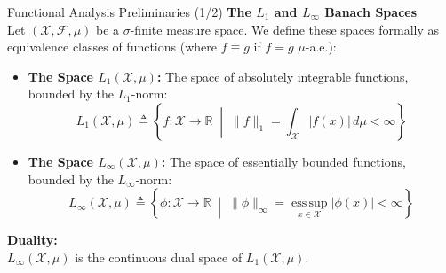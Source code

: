 \documentclass[10pt, aspectratio=169, xcolor=dvipsnames]{beamer}
\newcommand{\lead}[1]{{\color{UniBlue}\bfseries #1}}
\begin{document}
\begin{frame}{Functional Analysis Preliminaries (1/2)}
    \lead{The $L_1$ and $L_\infty$ Banach Spaces}\\
    Let $(\mathcal{X}, \mathcal{F}, \mu)$ be a $\sigma$-finite measure space. We define these spaces formally as equivalence classes of functions (where $f \equiv g$ if $f = g$ $\mu$-a.e.):
    
    \vspace{0.2cm}
    \begin{itemize}
        \item[{ \tikz\fill[Teal] (0,0) circle (2pt); }] \lead{The Space $L_1(\mathcal{X}, \mu)$:} The space of absolutely integrable functions, bounded by the $L_1$-norm:
        \[ L_1(\mathcal{X}, \mu) \triangleq \left\{ f : \mathcal{X} \to \mathbb{R} \;\middle|\; \|f\|_1 = \int_{\mathcal{X}} |f(x)| \, d\mu < \infty \right\} \]
        
        \vspace{0.1cm}
        \item[{ \tikz\fill[Teal] (0,0) circle (2pt); }] \lead{The Space $L_\infty(\mathcal{X}, \mu)$:} The space of essentially bounded functions, bounded by the $L_\infty$-norm:
        \[ L_\infty(\mathcal{X}, \mu) \triangleq \left\{ \phi : \mathcal{X} \to \mathbb{R} \;\middle|\; \|\phi\|_\infty = \operatorname*{ess\,sup}_{x \in \mathcal{X}} |\phi(x)| < \infty \right\} \]
    \end{itemize}

    \vspace{0.2cm}
    \lead{Duality:}\\
    $L_\infty(\mathcal{X}, \mu)$ is the continuous dual space of $L_1(\mathcal{X}, \mu)$.
\end{frame}
\end{document}
